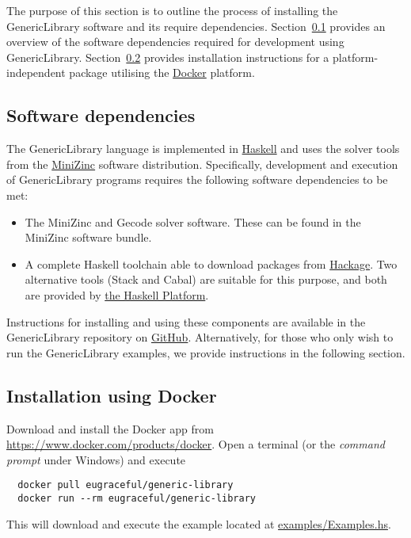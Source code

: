 
The purpose of this section is to outline the process of installing
the GenericLibrary software and its require dependencies.
%
Section~\ref{install-overview} provides an overview of the software
dependencies required for development using GenericLibrary.
%
Section~\ref{install-docker} provides installation instructions for a
platform-independent package utilising the
\href{https://www.docker.com/}{Docker}
platform.


\subsection{Software dependencies}
\label{install-overview}

The GenericLibrary language is implemented in
\href{https://www.haskell.org/}{Haskell} and uses the solver tools
from the \href{http://www.minizinc.org/}{MiniZinc} software
distribution.
%
Specifically, development and execution of \mbox{GenericLibrary} programs
requires the following software dependencies to be met:

\begin{itemize}
\item The MiniZinc and Gecode solver software.
%
  These can be found in the MiniZinc software bundle.
%
\item A complete Haskell toolchain able to download packages from
  \href{https://hackage.haskell.org/}{Hackage}.
%
  Two alternative tools (Stack and Cabal) are suitable for this
  purpose, and both are provided by
  \href{https://www.haskell.org/platform/}{the Haskell Platform}.
\end{itemize}

Instructions for installing and using these components are available in the
\mbox{GenericLibrary} repository on \href{https://github.com/GRACeFUL-project/%
GenericLibrary/blob/master/doc/INSTALL.md}{GitHub}.
%
Alternatively, for those who only wish to run the GenericLibrary
examples, we provide instructions in the following section.


\subsection{Installation using Docker}
\label{install-docker}

Download and install the Docker app from \url{https://www.docker.com/products/docker}.
%
Open a terminal (or the \emph{command prompt} under Windows) and
execute
\begin{verbatim}
  docker pull eugraceful/generic-library
  docker run --rm eugraceful/generic-library
\end{verbatim}

This will download and execute the example located at
\href{https://github.com/GRACeFUL-project/GenericLibrary/blob/master/examples/Examples.hs}{examples/Examples.hs}.

